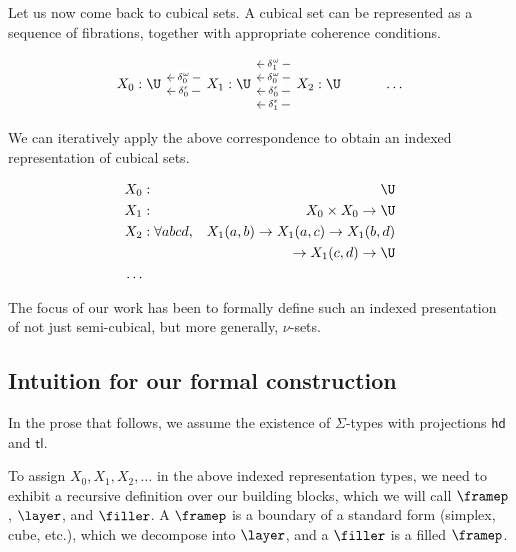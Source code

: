 \documentclass[10pt]{art.cls/art}
\newcommand{\tl}{\ensuremath{\mathsf{tl}}}
\newcommand{\hd}{\ensuremath{\mathsf{hd}}}
\begin{document}
Let us now come back to cubical sets. A cubical set can be represented as a sequence of fibrations, together with appropriate coherence conditions.

\begin{equation*}
  \begin{tikzcd}
    X_0 : \U & X_1 : \U \arrow[l, "\delta^\epsilon_0" description, shift left=2] \arrow[l, "\delta^\omega_0" description, shift right=2] & X_2 : \U \arrow[l, "\delta^\epsilon_1" description, shift left=6] \arrow[l, "\delta^\epsilon_0" description, shift left=2] \arrow[l, "\delta^\omega_0" description, shift right=2] \arrow[l, "\delta^\omega_1" description, shift right=6] & \ldots
  \end{tikzcd}
\end{equation*}

We can iteratively apply the above correspondence to obtain an indexed representation of cubical sets.

\begin{align*}
  X_0 & :                  & \U                                                       \\
  X_1 & :                  & X_0 \times X_0 \rightarrow \U                            \\
  X_2 & : \forall a b c d, & X_1 (a, b) \rightarrow X_1 (a, c) \rightarrow X_1 (b, d) \\
      &                    & \rightarrow X_1 (c, d) \rightarrow \U                    \\
  \ldots
\end{align*}

The focus of our work has been to formally define such an indexed presentation of not just semi-cubical, but more generally, $\nu$-sets.

\subsection{Intuition for our formal construction}
\begin{notation}[$\Sigma$]
  In the prose that follows, we assume the existence of $\Sigma$-types with projections $\hd$ and $\tl$.
\end{notation}

To assign $X_0, X_1, X_2, \ldots$ in the above indexed representation types, we need to exhibit a recursive definition over our building blocks, which we will call $\framep$, $\layer$, and $\filler$. A $\framep$ is a boundary of a standard form (simplex, cube, etc.), which we decompose into $\layer$, and a $\filler$ is a filled $\framep$.
\end{document}
